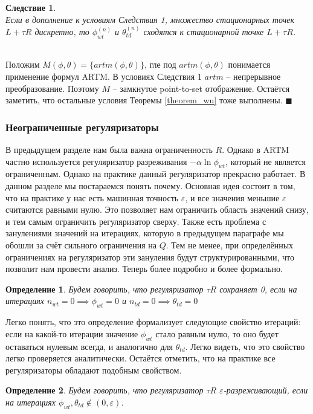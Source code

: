 \documentclass[12pt]{article}
\newtheorem{definition}{Определение}[section]
\newtheorem{conseq}{Следствие}[theorem]
\newenvironment{Proof} 
	{\par\noindent{\bf Доказательство.}} 
	{\hfill$\blacksquare$}
\begin{document}
\begin{conseq} \ \\
Если в дополнение к условиям Следствия 1, множество стационарных точек $L + \tau R$ дискретно, то $\phi_{wt}^{(n)}$ и $\theta_{td}^{(n)}$ сходятся к стационарной точке $L + \tau R$.
\end{conseq}
\begin{Proof}\ \\
Положим $M(\phi, \theta) = \{artm(\phi, \theta)\}$, гле под $artm(\phi, \theta)$ понимается применение формул ARTM. В условиях Следствия 1 $artm$ -- непрерывное преобразование. Поэтому $M$ -- замкнутое point-to-set отображение. Остаётся заметить, что остальные условия Теоремы \ref{theorem_wu} тоже выполнены.
\end{Proof}\ \\
\subsubsection{Неограниченные регуляризаторы}
В предыдущем разделе нам была важна ограниченность $R$. Однако в ARTM частно используется регуляризатор разреживания $- \alpha \ln \phi_{wt}$, который не является ограниченным. Однако на практике данный регуляризатор прекрасно работает. В данном разделе мы постараемся понять почему. Основная идея состоит в том, что на практике у нас есть машинная точность $\varepsilon$, и все значения меньшие $\varepsilon$ считаются равными нулю. Это позволяет нам ограничить область значений снизу, и тем самым ограничить регуляризатор сверху. Также есть проблема с занулениями значений на итерациях, которую в предыдущем параграфе мы обошли за счёт сильного ограничения на $Q$. Тем не менее, при определённых  ограничениях на регуляризатор эти зануления будут структурированными, что позволит нам провести анализ. Теперь более подробно и более формально.
\begin{definition}
Будем говорить, что регуляризатор $\tau R$ сохраняет 0, если на итерациях $n_{wt} = 0 \implies \phi_{wt} = 0$ и $n_{td} = 0 \implies \theta_{td} = 0$
\end{definition}
Легко понять, что это определение формализует следующие свойство итераций: если на какой-то итерации значение $\phi_{wt}$ стало равным нулю, то оно будет оставаться нулевым всегда, и аналогично для $\theta_{td}$. Легко видеть, что это свойство легко проверяется аналитически. Остаётся отметить, что на практике все регуляризаторы обладают подобным свойством.
\begin{definition}
Будем говорить, что регуляризатор $\tau R$ $\varepsilon$-разреживающий, если на итерациях $\phi_{wt}, \theta_{td} \notin (0, \varepsilon)$.
\end{definition}
\end{document}
